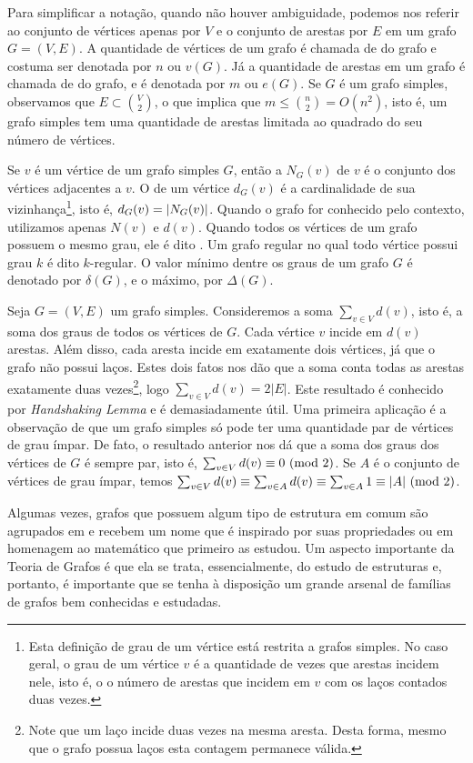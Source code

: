 Para simplificar a notação, quando não houver ambiguidade, podemos nos referir ao conjunto de vértices apenas por $V$ e o conjunto de arestas por $E$ em um grafo $G = (V,E)$. A quantidade de vértices de um grafo é chamada de  do grafo e costuma ser denotada por $n$ ou $v(G)$. Já a quantidade de arestas em um grafo é chamada de  do grafo, e é denotada por $m$ ou $e(G)$. Se $G$ é um grafo simples, observamos que $E \subset \binom{V}{2}$, o que implica que $m \leq \binom{n}{2} = O(n^2)$, isto é, um grafo simples tem uma quantidade de arestas limitada ao quadrado do seu número de vértices.

Se $v$ é um vértice de um grafo simples $G$, então a  $N_G(v)$ de $v$ é o conjunto dos vértices adjacentes a $v$. O  de um vértice $d_G(v)$ é a cardinalidade de sua vizinhança\footnote{Esta definição de grau de um vértice está restrita a grafos simples. No caso geral, o grau de um vértice $v$ é a quantidade de vezes que arestas incidem nele, isto é, o o número de arestas que incidem em $v$ com os laços contados duas vezes.}, isto é, $d_G(v) = \left | N_G(v) \right |$. Quando o grafo for conhecido pelo contexto, utilizamos apenas $N(v)$ e $d(v)$. Quando todos os vértices de um grafo possuem o mesmo grau, ele é dito . Um grafo regular no qual todo vértice possui grau $k$ é dito $k$-regular. O valor mínimo dentre os graus de um grafo $G$ é denotado por $\delta(G)$, e o máximo, por $\Delta(G)$.

Seja $G = (V,E)$ um grafo simples. Consideremos a soma $\sum_{v \in V}d(v)$, isto é, a soma dos graus de todos os vértices de $G$. Cada vértice $v$ incide em $d(v)$ arestas. Além disso, cada aresta incide em exatamente dois vértices, já que o grafo não possui laços. Estes dois fatos nos dão que a soma conta todas as arestas exatamente duas vezes\footnote{Note que um laço incide duas vezes na mesma aresta. Desta forma, mesmo que o grafo possua laços esta contagem permanece válida.}, logo $\sum_{v \in V}d(v) = 2|E|$.
Este resultado é conhecido por \emph{Handshaking Lemma} e é demasiadamente útil. Uma primeira aplicação é a observação de que um grafo simples só pode ter uma quantidade par de vértices de grau ímpar. De fato, o resultado anterior nos dá que a soma dos graus dos vértices de $G$ é sempre par, isto é, $\sum_{v \in V}d(v) \equiv 0 \ (\text{mod}\ 2)$. Se $A$ é o conjunto de vértices de grau ímpar, temos $\sum_{v \in V}d(v) \equiv \sum_{v \in A}d(v) \equiv \sum_{v \in A}1 \equiv |A| \ (\text{mod}\ 2)$.

Algumas vezes, grafos que possuem algum tipo de estrutura em comum são agrupados em  e recebem um nome que é inspirado por suas propriedades ou em homenagem ao matemático que primeiro as estudou. Um aspecto importante da Teoria de Grafos é que ela se trata, essencialmente, do estudo de estruturas e, portanto, é importante que se tenha à disposição um grande arsenal de famílias de grafos bem conhecidas e estudadas.

